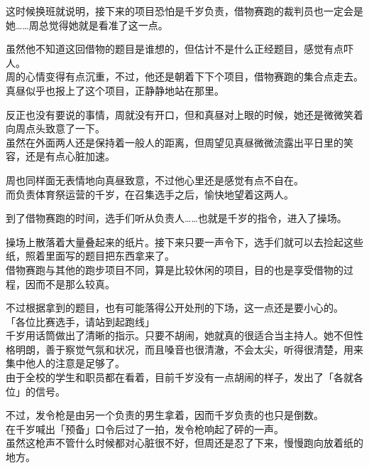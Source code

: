 这时候换班就说明，接下来的项目恐怕是千岁负责，借物赛跑的裁判员也一定会是她……周总觉得她就是看准了这一点。

虽然他不知道这回借物的题目是谁想的，但估计不是什么正经题目，感觉有点吓人。\\

周的心情变得有点沉重，不过，他还是朝着下下个项目，借物赛跑的集合点走去。真昼似乎也报上了这个项目，正静静地站在那里。

反正也没有要说的事情，周就没有开口，但和真昼对上眼的时候，她还是微微笑着向周点头致意了一下。\\

虽然在外面两人还是保持着一般人的距离，但周望见真昼微微流露出平日里的笑容，还是有点心脏加速。

周也同样面无表情地向真昼致意，不过他心里还是感觉有点不自在。\\

而负责体育祭运营的千岁，在召集选手之后，愉快地望着这两人。\\

\vspace{2\baselineskip}

到了借物赛跑的时间，选手们听从负责人……也就是千岁的指令，进入了操场。

操场上散落着大量叠起来的纸片。接下来只要一声令下，选手们就可以去捡起这些纸，照着里面写的题目把东西拿来了。\\

借物赛跑与其他的跑步项目不同，算是比较休闲的项目，目的也是享受借物的过程，因而不是那么较真。

不过根据拿到的题目，也有可能落得公开处刑的下场，这一点还是要小心的。\\

「各位比赛选手，请站到起跑线」\\

千岁用话筒做出了清晰的指示。只要不胡闹，她就真的很适合当主持人。她不但性格明朗，善于察觉气氛和状况，而且嗓音也很清澈，不会太尖，听得很清楚，用来集中他人的注意是足够了。\\

由于全校的学生和职员都在看着，目前千岁没有一点胡闹的样子，发出了「各就各位」的信号。

不过，发令枪是由另一个负责的男生拿着，因而千岁负责的也只是倒数。\\

在千岁喊出「预备」口令后过了一拍，发令枪响起了砰的一声。\\

虽然这枪声不管什么时候都对心脏很不好，但周还是忍了下来，慢慢跑向放着纸的地方。

